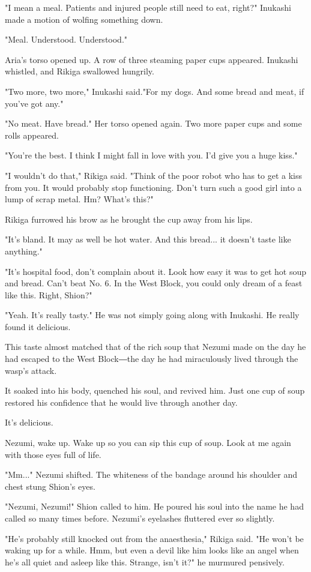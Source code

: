 "I mean a meal. Patients and injured people still need to eat, right?"
Inukashi made a motion of wolfing something down.

"Meal. Understood. Understood."

Aria's torso opened up. A row of three steaming paper cups appeared.
Inukashi whistled, and Rikiga swallowed hungrily.

"Two more, two more," Inukashi said."For my dogs. And some bread and
meat, if you've got any."

"No meat. Have bread." Her torso opened again. Two more paper cups and
some rolls appeared.

"You're the best. I think I might fall in love with you. I'd give you a
huge kiss."

"I wouldn't do that," Rikiga said. "Think of the poor robot who has to
get a kiss from you. It would probably stop functioning. Don't turn such
a good girl into a lump of scrap metal. Hm? What's this?"

Rikiga furrowed his brow as he brought the cup away from his lips.

"It's bland. It may as well be hot water. And this bread... it doesn't
taste like anything."

"It's hospital food, don't complain about it. Look how easy it was to
get hot soup and bread. Can't beat No. 6. In the West Block, you could
only dream of a feast like this. Right, Shion?"

"Yeah. It's really tasty." He was not simply going along with Inukashi.
He really found it delicious.

This taste almost matched that of the rich soup that Nezumi made on the
day he had escaped to the West Block―the day he had miraculously lived
through the wasp's attack.

It soaked into his body, quenched his soul, and revived him. Just one
cup of soup restored his confidence that he would live through another
day.

It's delicious.

Nezumi, wake up. Wake up so you can sip this cup of soup. Look at me
again with those eyes full of life.

"Mm..." Nezumi shifted. The whiteness of the bandage around his shoulder
and chest stung Shion's eyes.

"Nezumi, Nezumi!" Shion called to him. He poured his soul into the name
he had called so many times before. Nezumi's eyelashes fluttered ever so
slightly.

"He's probably still knocked out from the anaesthesia," Rikiga said. "He
won't be waking up for a while. Hmm, but even a devil like him looks
like an angel when he's all quiet and asleep like this. Strange, isn't
it?" he murmured pensively.

